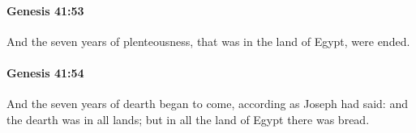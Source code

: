 		\paragraph{Genesis 41:53} %
			\label{GENESIS-41-53}

			And the seven years of plenteousness, that was in the land of Egypt, were ended.


		\paragraph{Genesis 41:54} %
			\label{GENESIS-41-54}

			And the seven years of dearth began to come, according as Joseph had said: and the dearth was in all lands; but in all the land of Egypt there was bread.


